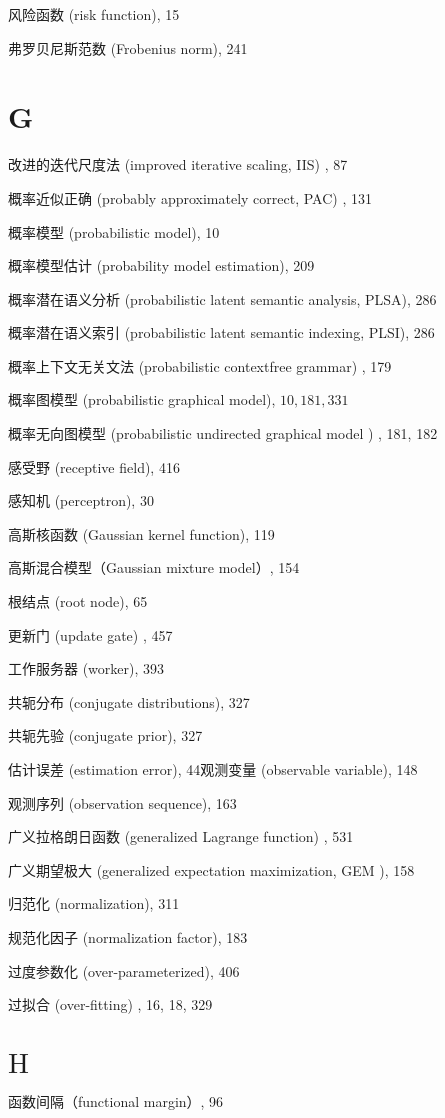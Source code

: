 \documentclass[10pt]{article}
\begin{document}
风险函数 (risk function), 15

弗罗贝尼斯范数 (Frobenius norm), 241

\section*{G}
改进的迭代尺度法 (improved iterative scaling, IIS) , 87

概率近似正确 (probably approximately correct, PAC) , 131

概率模型 (probabilistic model), 10

概率模型估计 (probability model estimation), 209

概率潜在语义分析 (probabilistic latent semantic analysis, PLSA), 286

概率潜在语义索引 (probabilistic latent semantic indexing, PLSI), 286

概率上下文无关文法 (probabilistic contextfree grammar) , 179

概率图模型 (probabilistic graphical model), $10,181,331$

概率无向图模型 (probabilistic undirected graphical model ) , 181, 182

感受野 (receptive field), 416

感知机 (perceptron), 30

高斯核函数 (Gaussian kernel function), 119

高斯混合模型（Gaussian mixture model）, 154

根结点 (root node), 65

更新门 (update gate) , 457

工作服务器 (worker), 393

共轭分布 (conjugate distributions), 327

共轭先验 (conjugate prior), 327

估计误差 (estimation error), 44观测变量 (observable variable), 148

观测序列 (observation sequence), 163

广义拉格朗日函数 (generalized Lagrange function) , 531

广义期望极大 (generalized expectation maximization, GEM ), 158

归范化 (normalization), 311

规范化因子 (normalization factor), 183

过度参数化 (over-parameterized), 406

过拟合 (over-fitting) , 16, 18, 329

\section*{$\mathrm{H}$}
函数间隔（functional margin）, 96
\end{document}
